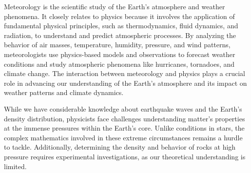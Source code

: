 Meteorology is the scientific study of the Earth's atmosphere and weather phenomena. It closely relates to physics because it involves the application of fundamental physical principles, such as thermodynamics, fluid dynamics, and radiation, to understand and predict atmospheric processes. By analyzing the behavior of air masses, temperature, humidity, pressure, and wind patterns, meteorologists use physics-based models and observations to forecast weather conditions and study atmospheric phenomena like hurricanes, tornadoes, and climate change. The interaction between meteorology and physics plays a crucial role in advancing our understanding of the Earth's atmosphere and its impact on weather patterns and climate dynamics.

While we have considerable knowledge about earthquake waves and the Earth's density distribution, physicists face challenges understanding matter's properties at the immense pressures within the Earth's core. Unlike conditions in stars, the complex mathematics involved in these extreme circumstances remains a hurdle to tackle. Additionally, determining the density and behavior of rocks at high pressure requires experimental investigations, as our theoretical understanding is limited.




